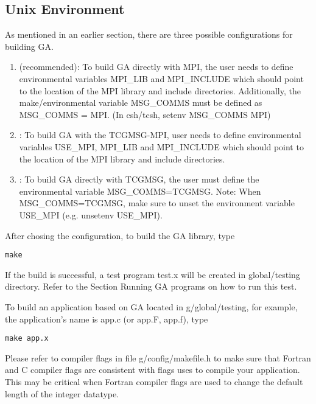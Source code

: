\subsection{Unix Environment }

As mentioned in an earlier section, there are three possible configurations
for building GA.
\begin{enumerate}
\item \textcolor{black}{} (recommended): To build
GA directly with MPI, the user needs to define environmental variables
MPI\_LIB and MPI\_INCLUDE which should point to the location of the
MPI library and include directories. Additionally, the make/environmental
variable MSG\_COMMS must be defined as MSG\_COMMS = MPI. (In csh/tcsh,
setenv MSG\_COMMS MPI)
\item \textcolor{black}{}: To build GA with
the TCGMSG-MPI, user needs to define environmental variables USE\_MPI,
MPI\_LIB and MPI\_INCLUDE which should point to the location of the
MPI library and include directories.


\item \textcolor{black}{}: To build GA directly
with TCGMSG, the user must define the environmental variable MSG\_COMMS=TCGMSG.
Note: When MSG\_COMMS=TCGMSG, make sure to unset the environment variable
USE\_MPI (e.g. unsetenv USE\_MPI).
\end{enumerate}
After chosing the configuration, to build the GA library, type 
\begin{verbatim}
make
\end{verbatim}
If the build is successful, a test program test.x will be created
in global/testing directory. Refer to the Section \textquotedbl{}Running
GA programs\textquotedbl{} on how to run this test.

To build an application based on GA located in g/global/testing, for
example, the application's name is app.c (or app.F, app.f), type 
\begin{verbatim}
make app.x
\end{verbatim}
Please refer to compiler flags in file g/config/makefile.h to make
sure that Fortran and C compiler flags are consistent with flags uses
to compile your application. This may be critical when Fortran compiler
flags are used to change the default length of the integer datatype.


